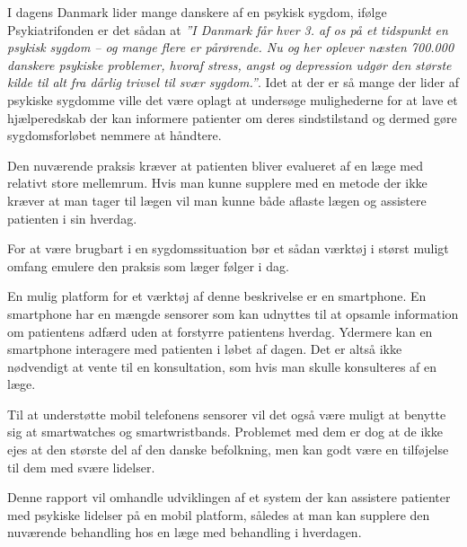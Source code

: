 


I dagens Danmark lider mange danskere af en psykisk sygdom, ifølge Psykiatrifonden er det sådan at \textit{''I Danmark får hver 3. af os på et tidspunkt en psykisk sygdom – og mange flere er pårørende. 
Nu og her oplever næsten 700.000 danskere psykiske problemer, hvoraf stress, angst og depression udgør den største kilde til alt fra dårlig trivsel til svær sygdom.''}\cite{psykiatrifonden}.
Idet at der er så mange der lider af psykiske sygdomme ville det være oplagt at undersøge mulighederne for at lave et hjælperedskab der kan informere patienter om deres sindstilstand og dermed gøre sygdomsforløbet nemmere at håndtere.

Den nuværende praksis kræver at patienten bliver evalueret af en læge med relativt store mellemrum.
Hvis man kunne supplere med en metode der ikke kræver at man tager til lægen vil man kunne både aflaste lægen og assistere patienten i sin hverdag.

For at være brugbart i en sygdomssituation bør et sådan værktøj i størst muligt omfang emulere den praksis som læger følger i dag.

En mulig platform for et værktøj af denne beskrivelse er en smartphone.
En smartphone har en mængde sensorer som kan udnyttes til at opsamle information om patientens adfærd uden at forstyrre patientens hverdag.
Ydermere kan en smartphone interagere med patienten i løbet af dagen. 
Det er altså ikke nødvendigt at vente til en konsultation, som hvis man skulle konsulteres af en læge.

Til at understøtte mobil telefonens sensorer vil det også være muligt at benytte sig at smartwatches og smartwristbands.
Problemet med dem er dog at de ikke ejes at den største del af den danske befolkning, men kan godt være en tilføjelse til dem med svære lidelser.

Denne rapport vil omhandle udviklingen af et system der kan assistere patienter med psykiske lidelser på en mobil platform, således at man kan supplere den nuværende behandling hos en læge med behandling i hverdagen.

